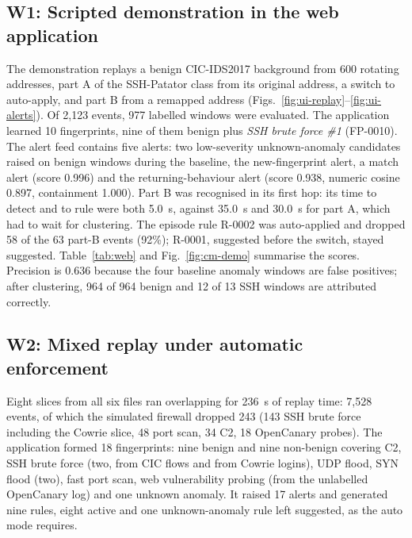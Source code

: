 \documentclass[conference]{IEEEtran}
\begin{document}
\subsection{W1: Scripted demonstration in the web application}
The demonstration replays a benign CIC-IDS2017 background from 600 rotating addresses, part A of the SSH-Patator class from its original address, a switch to auto-apply, and part B from a remapped address (Figs.~\ref{fig:ui-replay}--\ref{fig:ui-alerts}). Of 2,123 events, 977 labelled windows were evaluated. The application learned 10 fingerprints, nine of them benign plus \emph{SSH brute force \#1} (FP-0010). The alert feed contains five alerts: two low-severity unknown-anomaly candidates raised on benign windows during the baseline, the new-fingerprint alert, a match alert (score 0.996) and the returning-behaviour alert (score 0.938, numeric cosine 0.897, containment 1.000). Part B was recognised in its first hop: its time to detect and to rule were both 5.0~s, against 35.0~s and 30.0~s for part A, which had to wait for clustering. The episode rule R-0002 was auto-applied and dropped 58 of the 63 part-B events (92\%); R-0001, suggested before the switch, stayed suggested. Table~\ref{tab:web} and Fig.~\ref{fig:cm-demo} summarise the scores. Precision is 0.636 because the four baseline anomaly windows are false positives; after clustering, 964 of 964 benign and 12 of 13 SSH windows are attributed correctly.

\subsection{W2: Mixed replay under automatic enforcement}
Eight slices from all six files ran overlapping for 236~s of replay time: 7,528 events, of which the simulated firewall dropped 243 (143 SSH brute force including the Cowrie slice, 48 port scan, 34 C2, 18 OpenCanary probes). The application formed 18 fingerprints: nine benign and nine non-benign covering C2, SSH brute force (two, from CIC flows and from Cowrie logins), UDP flood, SYN flood (two), fast port scan, web vulnerability probing (from the unlabelled OpenCanary log) and one unknown anomaly. It raised 17 alerts and generated nine rules, eight active and one unknown-anomaly rule left suggested, as the auto mode requires.
\end{document}
